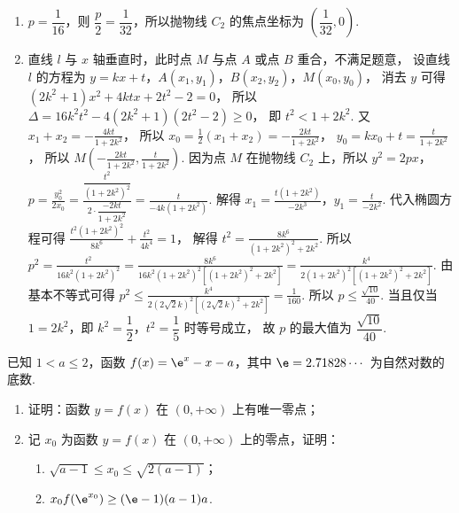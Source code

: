 \begin{solution}
\begin{enumerate}
\item \(p=\dfrac1{16}\)，则 \(\dfrac p2=\dfrac1{32}\)，所以抛物线 \(C_2\) 的焦点坐标为 \(\left(\dfrac{1}{32},0\right)\).

\item 直线 \(l\) 与 \(x\) 轴垂直时，此时点 \(M\) 与点 \(A\) 或点 \(B\) 重合，不满足题意，
设直线 \(l\) 的方程为 \(y=kx+t\)，\(A(x_1,y_1)\)，\(B(x_2,y_2)\)，\(M(x_0,y_0)\)，
消去 \(y\) 可得
\((2k^2+1)x^2+4ktx+2t^2-2=0\)，
所以
\(\Delta=16k^2t^2-4(2k^2+1)(2t^2-2)\ge0\)，
即
\(t^2<1+2k^2\).
又
\(x_1+x_2=-\frac{4kt}{1+2k^2}\)，
所以
\(x_0=\frac12(x_1+x_2)=-\frac{2kt}{1+2k^2}\)，
\(y_0=kx_0+t=\frac{t}{1+2k^2}\)，
所以
\(M\left(-\frac{2kt}{1+2k^2},\frac{t}{1+2k^2}\right)\).
因为点 \(M\) 在抛物线 \(C_2\) 上，所以 \(y^2=2px\)，
\(p=\frac{y_0^2}{2x_0} =\frac{\dfrac{t^2}{(1+2k^2)^2}}{2\cdot\dfrac{-2kt}{1+2k^2}} =\frac{t}{-4k(1+2k^2)}\).
解得
\(x_1=\frac{t(1+2k^2)}{-2k^3}\)，\(y_1=\frac{t}{-2k^2}\).
代入椭圆方程可得
\(\frac{t^2(1+2k^2)^2}{8k^6}+\frac{t^2}{4k^4}=1\)，
解得
\(t^2=\frac{8k^6}{(1+2k^2)^2+2k^2}\).
所以
\(p^2=\frac{t^2}{16k^2(1+2k^2)^2} =\frac{8k^6}{16k^2(1+2k^2)^2[(1+2k^2)^2+2k^2]} =\frac{k^4}{2(1+2k^2)^2[(1+2k^2)^2+2k^2]}\).
由基本不等式可得
\(p^2\le\frac{k^4}{2(2\sqrt2k)^2[(2\sqrt2k)^2+2k^2]}=\frac1{160}\).
所以
\(p\le\frac{\sqrt{10}}{40}\).
当且仅当 \(1=2k^2\)，即 \(k^2=\dfrac12\)，\(t^2=\dfrac15\) 时等号成立，
故 \(p\) 的最大值为 \(\dfrac{\sqrt{10}}{40}\).
\end{enumerate}
\end{solution}

\begin{problem}
已知 \(1<a\le2\)，函数 \(f(x)=\e^x-x-a\)，其中 \(\e=2.71828\cdots\) 为自然对数的底数.

\begin{enumerate}
\item 证明：函数 \(y=f(x)\) 在 \((0,+\infty)\) 上有唯一零点；

\item 记 \(x_0\) 为函数 \(y=f(x)\) 在 \((0,+\infty)\) 上的零点，证明：

\begin{enumerate}
\item \(\sqrt{a-1}\le x_0\le\sqrt{2(a-1)}\)；
\item \(x_0f(\e^{x_0})\ge(\e-1)(a-1)a\).
\end{enumerate}
\end{enumerate}
\end{problem}

